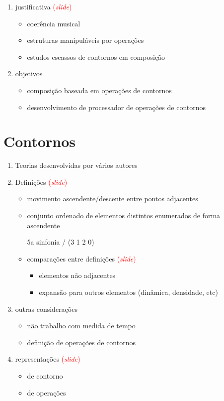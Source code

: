 \documentclass[12pt,a4paper]{article}
\newcommand{\slide}{\textcolor{red}{(\textit{slide})}}
\begin{document}
\begin{enumerate}
\item justificativa \slide{}
  \begin{itemize}
  \item coerência musical
  \item estruturas manipuláveis por operações
  \item estudos escassos de contornos em composição
  \end{itemize}
\item objetivos
  \begin{itemize}
  \item composição baseada em operações de contornos
  \item desenvolvimento de processador de operações de contornos
  \end{itemize}
\end{enumerate}

\section{Contornos}

\begin{enumerate}
\item Teorias desenvolvidas por vários autores
\item Definições \slide{}
  \begin{itemize}
  \item movimento ascendente/descente entre pontos adjacentes 

  \item conjunto ordenado de elementos distintos enumerados de forma
    ascendente

    5a sinfonia / (3 1 2 0)
  \item comparações entre definições \slide{}
    \begin{itemize}
    \item elementos não adjacentes
    \item expansão para outros elementos (dinâmica, densidade, etc)
    \end{itemize}
  \end{itemize}
\item outras considerações
  \begin{itemize}
  \item não trabalho com medida de tempo
  \item definição de operações de contornos
  \end{itemize}
\item representações \slide{}
  \begin{itemize}
  \item de contorno
  \item de operações
  \end{itemize}
\end{enumerate}
\end{document}
